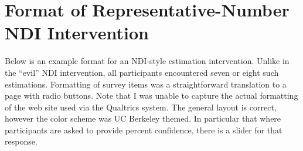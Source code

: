\chapter{Format of Representative-Number NDI Intervention}
\label{app:format-ndi}

Below is an example format for an NDI-style estimation intervention.  Unlike in
the “evil” NDI intervention, all participants encountered seven or eight such
estimations. Formatting of survey items was a straightforward translation to a
page with radio buttons. Note that I was unable to capture the actual formatting
of the web site used via the Qualtrics system. The general layout is correct,
however the color scheme was UC Berkeley themed. In particular that where
participants are asked to provide percent confidence, there is a slider for that
response.



